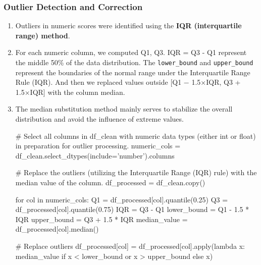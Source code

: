\documentclass[12pt]{article}
\numberwithin{figure}{section}  %
\begin{document}
\subsubsection{Outlier Detection and Correction}
	\begin{enumerate}
		\item Outliers in numeric scores were identified using the \textbf{IQR
		(interquartile range) method}.
		\item For each numeric column, we computed Q1, Q3. IQR = Q3 - Q1
		represent the middle 50\% of the data distribution. The \texttt{lower\_bound} and
		\texttt{upper\_bound} represent the boundaries of the normal range under the
		Interquartile Range Rule (IQR). And then we replaced values outside [Q1
		− 1.5×IQR, Q3 + 1.5×IQR] with the column median. 
		\item The median substitution method mainly serves to stabilize the
		overall distribution and avoid the influence of extreme values.
		\begin{python}
# Select all columns in df_clean with numeric data types (either int or float) in preparation for outlier processing.
numeric_cols = df_clean.select_dtypes(include='number').columns

# Replace the outliers (utilizing the Interquartile Range (IQR) rule) with the median value of the column.
df_processed = df_clean.copy()

for col in numeric_cols:
    Q1 = df_processed[col].quantile(0.25)
    Q3 = df_processed[col].quantile(0.75)
    IQR = Q3 - Q1
    lower_bound = Q1 - 1.5 * IQR
    upper_bound = Q3 + 1.5 * IQR
    median_value = df_processed[col].median()

    # Replace outliers
    df_processed[col] = df_processed[col].apply(lambda x: median_value if x < lower_bound or x > upper_bound else x)
                                           

		\end{python}
	\end{enumerate}
\end{document}
